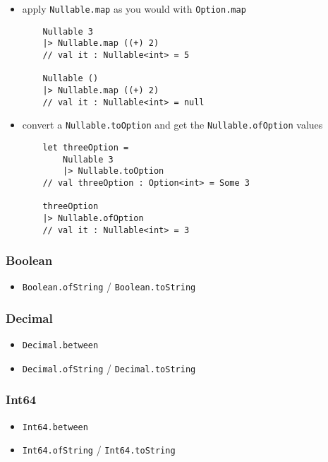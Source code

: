 \documentclass{article}
\begin{document}
\begin{itemize}

\item apply \texttt{Nullable.map} as you would with \texttt{Option.map}
\begin{verbatim}
    Nullable 3
    |> Nullable.map ((+) 2)
    // val it : Nullable<int> = 5
    
    Nullable ()
    |> Nullable.map ((+) 2)
    // val it : Nullable<int> = null
\end{verbatim}

\item convert a \texttt{Nullable.toOption} and get the \texttt{Nullable.ofOption} values
\begin{verbatim}
    let threeOption =
        Nullable 3
        |> Nullable.toOption
    // val threeOption : Option<int> = Some 3
    
    threeOption
    |> Nullable.ofOption
    // val it : Nullable<int> = 3
\end{verbatim}

\end{itemize}

\subsubsection{Boolean}

\begin{itemize}
\item \texttt{Boolean.ofString} / \texttt{Boolean.toString}
\end{itemize}

\subsubsection{Decimal}

\begin{itemize}
\item \texttt{Decimal.between}
\item \texttt{Decimal.ofString} / \texttt{Decimal.toString}
\end{itemize}

\subsubsection{Int64}

\begin{itemize}
\item \texttt{Int64.between}
\item \texttt{Int64.ofString} / \texttt{Int64.toString}
\end{itemize}
\end{document}

